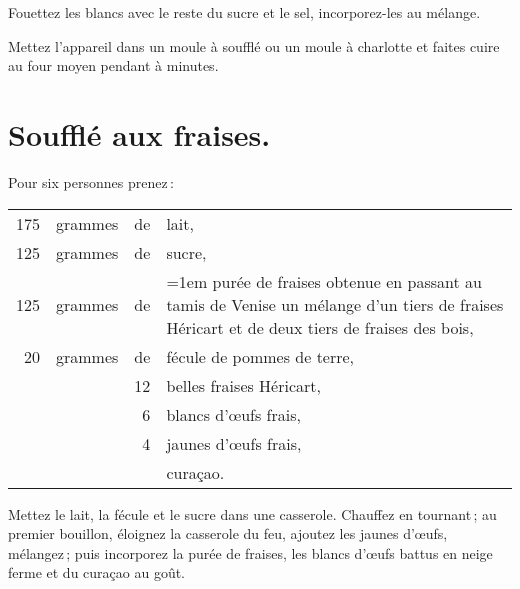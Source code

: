 Fouettez les blancs avec le reste du sucre et le sel, incorporez-les au mélange.

Mettez l'appareil dans un moule à soufflé ou un moule à charlotte et faites
cuire au four moyen pendant {\mmm} à {\mmm} minutes.

\section*{\centering Soufflé aux fraises.}
{}

Pour six personnes prenez :

\footnotesize
\begin{longtable}{rrr>{\raggedright\arraybackslash}p{16em}}
    175 & grammes & de & lait,                                                                            \\
    125 & grammes & de & sucre,                                                                           \\
    125 & grammes & de & \hangindent=1em purée de fraises obtenue en passant au tamis de
                         Venise un mélange d'un tiers de fraises Héricart et de deux tiers
                         de fraises des bois,                                                             \\
     20 & grammes & de & fécule de pommes de terre,                                                       \\
        &         & 12 & belles fraises Héricart,                                                         \\
        &         &  6 & blancs d'œufs frais,                                                             \\
        &         &  4 & jaunes d'œufs frais,                                                             \\
        &         &    & curaçao.                                                                         \\
\end{longtable}
\normalsize

Mettez le lait, la fécule et le sucre dans une casserole. Chauffez en
tournant ; au premier bouillon, éloignez la casserole du feu, ajoutez les
jaunes d'œufs, mélangez ; puis incorporez la purée de fraises, les blancs
d'œufs battus en neige ferme et du curaçao au goût.

